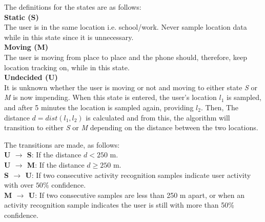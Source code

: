 The definitions for the states are as follows:\\

\textbf{Static (S)}\\
The user is in the same location i.e. school/work. Never sample location data while in this state since it is unnecessary.\\

\textbf{Moving (M)}\\
The user is moving from place to place and the phone should, therefore, keep location tracking on, while in this state.\\

\textbf{Undecided (U)}\\
It is unknown whether the user is moving or not and moving to either state \textit{S} or \textit{M} is now impending. When this state is entered, the user's location $l_1$ is sampled, and after 5 minutes the location is sampled again, providing $l_2$. Then,  The distance $d = dist(l_1, l_2)$ is calculated and from this, the algorithm will transition to either \textit{S} or \textit{M} depending on the distance between the two locations.

The transitions are made, as follows:\\

\textbf{U $\rightarrow$ S}: If the distance $d < 250$ m.\\

\textbf{U $\rightarrow$ M}: If the distance $d \geq 250$ m.\\

\textbf{S $\rightarrow$ U}: If two consecutive activity recognition samples indicate user activity with over $50\%$ confidence.\\

\textbf{M $\rightarrow$  U}: If two consecutive samples are less than 250 m apart, or when an activity recognition sample indicates the user is still with more than 50\% confidence.\\